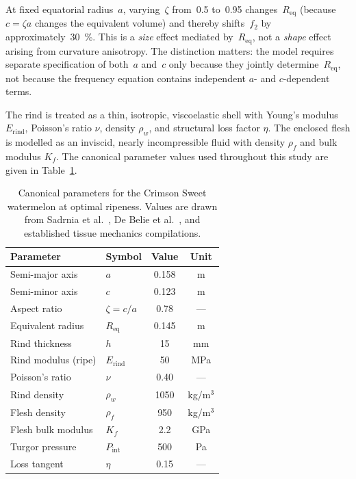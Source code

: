 At fixed equatorial radius~$a$, varying~$\zeta$ from~0.5 to~0.95
changes~$R_{\mathrm{eq}}$ (because $c = \zeta a$ changes the
equivalent volume) and thereby shifts~$f_2$ by
approximately~\SI{30}{\percent}.  This is a \emph{size} effect
mediated by~$R_{\mathrm{eq}}$, not a \emph{shape} effect arising
from curvature anisotropy.  The distinction matters: the model
requires separate specification of both~$a$ and~$c$ only because
they jointly determine~$R_{\mathrm{eq}}$, not because the frequency
equation contains independent $a$- and $c$-dependent terms.

The rind is treated as a thin, isotropic, viscoelastic shell with Young's
modulus $E_{\mathrm{rind}}$, Poisson's ratio $\nu$, density
$\rho_w$, and structural loss factor $\eta$.  The enclosed flesh is
modelled as an inviscid, nearly incompressible fluid with density
$\rho_f$ and bulk modulus $K_f$.  The canonical parameter values used
throughout this study are given in Table~\ref{tab:canonical}.

\begin{table}[t]
  \centering
  \caption{Canonical parameters for the Crimson Sweet watermelon at
    optimal ripeness.  Values are drawn from Sadrnia et
    al.~\cite{Sadrnia2008}, De Belie et al.~\cite{DeBelieetal2000},
    and established tissue mechanics compilations.}
  \label{tab:canonical}
  \begin{tabular}{llcc}
    \toprule
    Parameter & Symbol & Value & Unit \\
    \midrule
    Semi-major axis    & $a$                 & 0.158 & m \\
    Semi-minor axis    & $c$                 & 0.123 & m \\
    Aspect ratio       & $\zeta = c/a$       & 0.78  & --- \\
    Equivalent radius  & $R_{\mathrm{eq}}$   & 0.145 & m \\
    Rind thickness     & $h$                 & 15    & mm \\
    Rind modulus (ripe) & $E_{\mathrm{rind}}$ & 50   & MPa \\
    Poisson's ratio    & $\nu$               & 0.40  & --- \\
    Rind density       & $\rho_w$            & 1050  & kg/m$^3$ \\
    Flesh density      & $\rho_f$            & 950   & kg/m$^3$ \\
    Flesh bulk modulus  & $K_f$              & 2.2   & GPa \\
    Turgor pressure     & $P_{\mathrm{int}}$ & 500   & Pa \\
    Loss tangent        & $\eta$             & 0.15  & --- \\
    \bottomrule
  \end{tabular}
\end{table}

